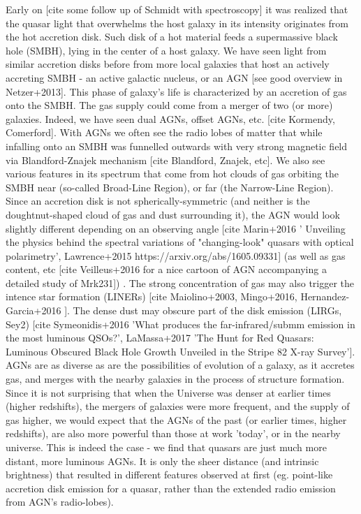 \documentclass[modern]{aastex62}
\begin{document}
Early on [cite some follow up of Schmidt with spectroscopy] it was realized that the quasar light that overwhelms the host galaxy in its intensity originates from the hot accretion disk.  Such disk of a hot material feeds a supermassive black hole (SMBH), lying in the center of a host galaxy. We have seen light from similar accretion disks before from more local galaxies that host an actively accreting SMBH  - an active galactic nucleus, or an AGN [see good overview in Netzer+2013]. This phase of galaxy's life is characterized by an accretion of gas onto the SMBH. The gas supply could come from a merger of two (or more) galaxies. Indeed, we have seen dual AGNs, offset AGNs, etc. [cite Kormendy, Comerford]. With AGNs we often see the radio lobes of matter that while infalling onto an SMBH was funnelled outwards with very strong magnetic field via Blandford-Znajek mechanism [cite Blandford, Znajek, etc]. We also see various features in its spectrum that come from hot clouds of gas orbiting the SMBH near (so-called Broad-Line Region), or far (the Narrow-Line Region). Since an accretion disk is not spherically-symmetric (and neither is the doughtnut-shaped cloud of gas and dust surrounding it), the AGN would look slightly different depending on an observing angle [cite Marin+2016 ' Unveiling the physics behind the spectral variations of "changing-look" quasars with optical polarimetry', Lawrence+2015  https://arxiv.org/abs/1605.09331] (as well as gas content, etc [cite Veilleus+2016 for a nice cartoon of AGN accompanying a detailed study of Mrk231]) . The strong concentration of gas may also trigger the intence star formation (LINERs) [cite Maiolino+2003, Mingo+2016, Hernandez-Garcia+2016 ]. The dense  dust may obscure part of the disk emission (LIRGs, Sey2) [cite Symeonidis+2016 'What produces the far-infrared/submm emission in the most luminous QSOs?', LaMassa+2017 'The Hunt for Red Quasars: Luminous Obscured Black Hole Growth Unveiled  in the Stripe 82 X-ray Survey']. AGNs are as diverse as are the possibilities of evolution of a galaxy, as it accretes gas, and merges with the nearby galaxies in the process of structure formation. Since it is not surprising that when the Universe was denser at earlier times (higher redshifts), the mergers of galaxies were more frequent, and the supply of gas higher, we would expect that the AGNs of the past (or earlier times, higher redshifts), are also more powerful than those at work 'today', or in the nearby universe. This is indeed the case - we find that quasars are just much more distant, more luminous AGNs. It is only the sheer distance (and intrinsic brightness) that resulted in different features observed at first (eg. point-like accretion disk emission for a quasar, rather than the extended radio emission from AGN's radio-lobes). 
\end{document}

